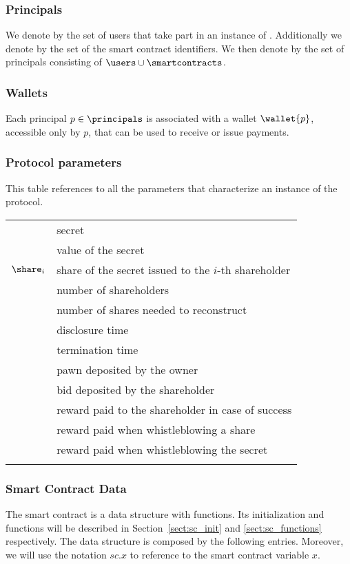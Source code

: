 \subsubsection*{Principals}
We denote by \users the set of users that take part in an instance of \shortname.
Additionally we denote by \smartcontracts the set of the smart contract identifiers.
We then denote by \principals the set of principals consisting of $\users \cup \smartcontracts$.

\medskip

\subsubsection*{Wallets}
Each principal $p \in \principals$ is associated with a wallet $\wallet{p}$, accessible only by $p$, that can be used to receive or issue payments.

\medskip

\subsubsection*{Protocol parameters}
This table references to all the parameters that characterize an instance of the \shortname protocol. \\

\begin{tabular}{ll}
	\secret & secret \\
	\V & value of the secret \\
	$\share_{i}$ & share of the secret issued to the $i$-th shareholder \\
	\N & number of shareholders \\
	\K & number of shares needed to reconstruct \secret \\	
	\td & disclosure time \\
	\te & termination time \\
	\PO & pawn deposited by the owner \\
	\BH & bid deposited by the shareholder \\
	\RH & reward paid to the shareholder in case of success \\
	\Wshare & reward paid when whistleblowing a share \\
	\Wsecret & reward paid when whistleblowing the secret \\

	& \\
\end{tabular}

\subsubsection*{Smart Contract Data}
The \shortname smart contract is a data structure with functions. 
Its initialization and functions will be described in Section~\ref{sect:sc_init} and \ref{sect:sc_functions} respectively. The data structure is composed by the following entries.
Moreover, we will use the notation $sc.x$ to reference to the smart contract variable $x$.


